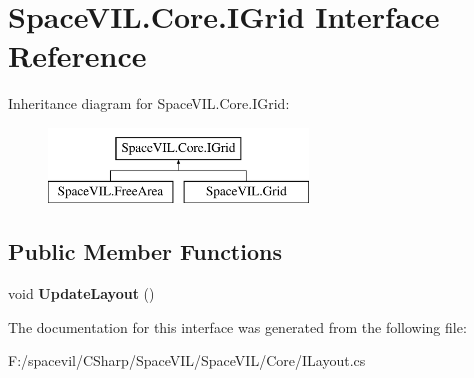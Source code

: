\hypertarget{interface_space_v_i_l_1_1_core_1_1_i_grid}{}\section{Space\+V\+I\+L.\+Core.\+I\+Grid Interface Reference}
\label{interface_space_v_i_l_1_1_core_1_1_i_grid}
Inheritance diagram for Space\+V\+I\+L.\+Core.\+I\+Grid\+:\begin{figure}[H]
\begin{center}
\leavevmode
\includegraphics[height=2.000000cm]{interface_space_v_i_l_1_1_core_1_1_i_grid}
\end{center}
\end{figure}
\subsection*{Public Member Functions}
\begin{DoxyCompactItemize}
\item 
\mbox{\label{interface_space_v_i_l_1_1_core_1_1_i_grid_a4093736c7b8ffddcdc79413b6de8579a}} 
void {\bfseries Update\+Layout} ()
\end{DoxyCompactItemize}


The documentation for this interface was generated from the following file\+:\begin{DoxyCompactItemize}
\item 
F\+:/spacevil/\+C\+Sharp/\+Space\+V\+I\+L/\+Space\+V\+I\+L/\+Core/I\+Layout.\+cs\end{DoxyCompactItemize}
